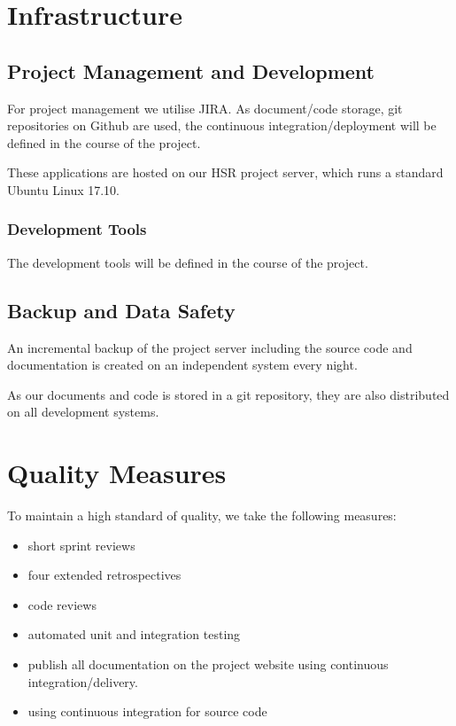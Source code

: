 \chapter{Infrastructure}
\section{Project Management and Development}
For project management we utilise JIRA\cite{atlassian-opensource}. As document/code storage, git repositories on Github are used, the continuous integration/deployment will be defined in the course of the project. %

These applications are hosted on our HSR project server, which runs a standard Ubuntu Linux 17.10.


\subsection{Development Tools}
The development tools will be defined in the course of the project. %

\section{Backup and Data Safety}
An incremental backup of the project server including the source code and documentation is created on an independent system every night.

As our documents and code is stored in a git repository, they are also distributed on all development systems.


\chapter{Quality Measures}
To maintain a high standard of quality, we take the following measures:

\begin{multicols}{2}
    \begin{itemize}
        \item short sprint reviews
        \item four extended retrospectives
        \item code reviews
        \item automated unit and integration testing
        \item publish all documentation on the project website using continuous integration/delivery.
        \item using continuous integration for source code
    \end{itemize}
\end{multicols}

